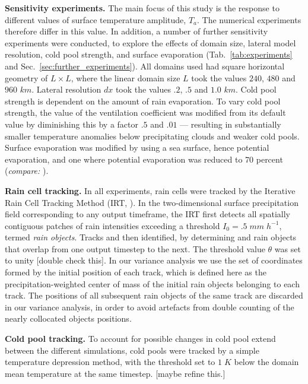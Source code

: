 \documentclass[draft,linenumbers]{agujournal2019}
\begin{document}
\noindent
{\bf Sensitivity experiments.} 
The main focus of this study is the response to different values of surface temperature amplitude, $T_a$. 
The numerical experiments therefore differ in this value.
In addition, a number of further sensitivity experiments were conducted, to explore the effects of domain size, lateral model resolution, cold pool strength, and surface evaporation (Tab.~\ref{tab:experiments} and Sec.~\ref{sec:further_experiments}).
All domains used had square horizontal geometry of $L\times L$, where the linear domain size $L$ took the values $240$, $480$ and $960$ $km$.
Lateral resolution $dx$ took the values $.2$, $.5$ and $1.0$ $km$.
Cold pool strength is dependent on the amount of rain evaporation. To vary cold pool strength, the value of the ventilation coefficient was modified from its default value \cite{seifert2006two} by diminishing this by a factor $.5$ and $.01$ --- resulting in substantially smaller temperature anomalies below precipitating clouds and weaker cold pools.
Surface evaporation was modified by using a sea surface, hence potential evaporation, and one where potential evaporation was reduced to 70 percent ({\it compare:} \cite{moseley2016}).

\noindent
{\bf Rain cell tracking.}
In all experiments, rain cells were tracked by the Iterative Rain Cell Tracking Method (IRT, \cite{moseley2019statistical}).
In the two-dimensional surface precipitation field corresponding to any output timeframe, the IRT first detects all spatially contiguous patches of rain intensities exceeding a threshold $I_0=.5\;mm\;h^{-1}$, termed {\it rain objects}.
Tracks and then identified, by determining and rain objects that overlap from one output timestep to the next. 
The threshold value $\theta$ was set to unity [double check this].
In our variance analysis we use the set of coordinates formed by the initial position of each track, which is defined here as the precipitation-weighted center of mass of the initial rain objects belonging to each track.
The positions of all subsequent rain objects of the same track are discarded in our variance analysis, in order to avoid artefacts from double counting of the nearly collocated objects positions.

\noindent
{\bf Cold pool tracking.}
To account for possible changes in cold pool extend between the different simulations, cold pools were tracked by a simple temperature depression method, with the threshold set to $1\;K$ below the domain mean temperature at the same timestep.
[maybe refine this.]
\end{document}
